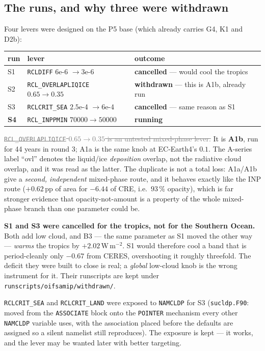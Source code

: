 \documentclass[10pt]{article}
\newcommand{\dead}[1]{\textcolor{gray}{\sout{#1}}}
\begin{document}
\subsection{The runs, and why three were withdrawn}\label{sub:r23runs}
Four levers were designed on the P5 base (which already carries G4, K1 and D2b):

\begin{center}\footnotesize
\begin{tabular}{l l l}
\toprule
run & lever & outcome \\
\midrule
S1 & \texttt{RCLDIFF} $6$e-6 $\to3$e-6 & \textbf{cancelled} --- would cool the tropics \\
S2 & \texttt{RCL\_OVERLAPLIQICE} $0.65\to0.35$ & \textbf{withdrawn} --- this is A1b, already run \\
S3 & \texttt{RCLCRIT\_SEA} $2.5$e-4 $\to6$e-4 & \textbf{cancelled} --- same reason as S1 \\
\textbf{S4} & \texttt{RCL\_INPPMIN} $70000\to50000$ & \textbf{running} \\
\bottomrule
\end{tabular}
\end{center}

\dead{\texttt{RCL\_OVERLAPLIQICE} $0.65\to0.35$ is an untested mixed-phase lever.} It is
\textbf{A1b}, run for 44 years in round 3; A1a is the same knob at EC-Earth4's $0.1$. The
A-series label ``ovl'' denotes the liquid/ice \emph{deposition} overlap, not the radiative
cloud overlap, and it was read as the latter. The duplicate is not a total loss: A1a/A1b give
a \emph{second, independent} mixed-phase route, and it behaves exactly like the INP route
($+0.62$\,pp of area for $-6.44$ of CRE, i.e.\ $93\,\%$ opacity), which is far stronger
evidence that opacity-not-amount is a property of the whole mixed-phase branch than one
parameter could be.

\textbf{S1 and S3 were cancelled for the tropics, not for the Southern Ocean.} Both add low
cloud, and B3 --- the same parameter as S1 moved the other way --- \emph{warms} the tropics by
$+2.02$\,W\,m$^{-2}$. S1 would therefore cool a band that is period-cleanly only $-0.67$ from
CERES, overshooting it roughly threefold. The deficit they were built to close is real; a
\emph{global} low-cloud knob is the wrong instrument for it. Their runscripts are kept under
\texttt{runscripts/oifsamip/withdrawn/}.

\texttt{RCLCRIT\_SEA} and \texttt{RCLCRIT\_LAND} were exposed to \texttt{NAMCLDP} for S3
(\texttt{sucldp.F90}: moved from the \texttt{ASSOCIATE} block onto the \texttt{POINTER}
mechanism every other \texttt{NAMCLDP} variable uses, with the association placed before the
defaults are assigned so a silent namelist still reproduces). The exposure is kept --- it
works, and the lever may be wanted later with better targeting.
\end{document}
